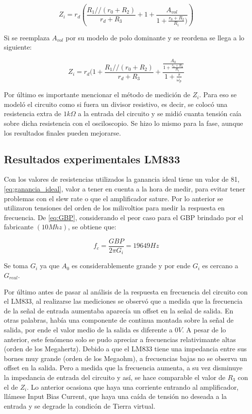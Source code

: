 \begin{equation}\label{eq:zin_real}
Z_i = r_d(\frac{R_1 // (r_0 + R_2)}{r_d + R_3} + 1 + \frac{A_{vol}}{1 + \frac{r_0 + R_2}{R_1})})
\end{equation}

Si se reemplaza $A_{vol}$ por su modelo de polo dominante y se reordena se llega a lo siguiente:

\begin{equation}\label{eq:zin_completa}
Z_i = r_d(1 + \frac{R_1 // (r_0 + R_2)}{r_d + R_3} + \frac{\frac{A_0}{1 + \frac{r_0 + R_2}{R_1}}}{1 + \frac{s}{\omega_p}}
\end{equation}

Por último es importante mencionar el método de medición de $Z_i$. Para eso se modeló el circuito como si fuera un divisor resistivo, es decir, se colocó una resistencia extra de $1k\Omega$ a la entrada del circuito y se midió cuanta tensión caía sobre dicha resistencia con el osciloscopio. Se hizo lo mismo para la fase, aunque los resultados finales pueden mejorarse. 


\subsection{Resultados experimentales LM833}

Con los valores de resistencias utilizados la ganancia ideal tiene un valor de 81, \ref{eq:ganancia_ideal}, valor a tener en cuenta a la hora de medir, para evitar tener problemas con el slew rate o que el amplificador sature. Por lo anterior se utilizaron tensiones del orden de los milivoltios para medir la respuesta en frecuencia. De \ref{eq:GBP}, considerando el peor caso para el GBP brindado por el fabricante $(10 Mhz)$, se obtiene que:

\begin{equation}\label{eq:frecuencia_corte_LM833}
f_c = \frac{GBP}{2\pi G_i} = 19649 Hz
\end{equation} 

Se toma $G_i$ ya que $A_0$ es considerablemente grande y por ende $G_i$ es cercano a $G_{real}$. 


Por último antes de pasar al análisis de la respuesta en frecuencia del circuito con el LM833, al realizarse las mediciones se observó que a medida que la frecuencia de la señal de entrada aumentaba aparecía un offset en la señal de salida. En otras palabras, había una componente de continua montada sobre la señal de salida, por ende el valor medio de la salida es diferente a $0 V$. A pesar de lo anterior, este fenómeno solo se pudo apreciar a frecuencias relativimante altas (orden de los Megahertz). Debido a que el LM833 tiene una impedancia entre sus bornes muy grande (orden de los Megaohm), a frecuencias bajas no se observa un offset en la salida. Pero a medida que la frecuencia aumenta, a su vez disminuye la impedancia de entrada del circuito y así, se hace comparable el valor de $R_3$ con el de $Z_i$. Lo anterior ocasiona que haya una corriente entrando al amplificador, llámese Input Bias Current, que haya una caída de tensión no deseada a la entrada y se degrade la condicón de Tierra virtual. 

